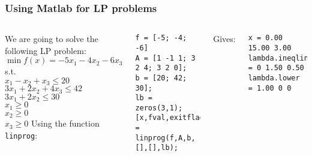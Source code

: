 \documentclass[11pt,table,final,fleqn,xcolor={usenames,dvipsnames,table}]{beamer}
\begin{document}
\begin{frame}[fragile]
  \frametitle{Using Matlab for LP problems}
  \begin{columns}
    We are going to solve the following LP problem:\\
    $\min f(x) = -5x_1 -4x_2 - 6x_3$ \\
    s.t. \\
    $x_1 - x_2 + x_3 \leq 20$ \\
    $3x_1 + 2x_2 + 4x_3 \leq 42$ \\
    $3x_1 + 2x_2 \leq 30$ \\
    $x_1 \geq 0$ \\
    $x_2 \geq 0$ \\
    $x_3 \geq 0$
    Using the function \lstinline$linprog$:
    \begin{lstlisting}
f = [-5; -4; -6]
A = [1 -1 1; 3 2 4; 3 2 0];
b = [20; 42; 30];
lb = zeros(3,1);
[x,fval,exitflag,output,lambda]
= linprog(f,A,b,[],[],lb);
    \end{lstlisting}
Gives:
    \begin{lstlisting}
x = 0.00 15.00 3.00
lambda.ineqlin = 0 1.50 0.50
lambda.lower = 1.00 0 0
    \end{lstlisting}
  \end{columns}
\end{frame}
\end{document}

